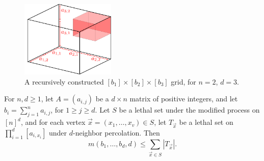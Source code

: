 \begin{figure}[]
\centering
\includegraphics[width=0.4\textwidth]{figures/2/recursion.pdf}
\caption{A recursively constructed $[b_1] \times [b_2] \times [b_3]$ grid, for $n = 2$, $d = 3$.}
\label{fig:recursion}
\end{figure} 

\begin{lem}
\label{lem:recursion}
For $n,d \geq 1$, let $A = (a_{i,j})$ be a $d \times n$ matrix of positive integers, and let $b_i = \sum_{j=1}^n a_{i,j}$, for $1 \geq j \geq d$. Let $S$ be a lethal set under the modified process on $[n]^d$, and for each vertex $\vec{x} = (x_1, \dots, x_v) \in S$, let $T_{\vec{x}}$ be a lethal set on $\prod_{i=1}^d [a_{i,x_i}]$ under $d$-neighbor percolation. Then
$$m(b_1, \dots, b_d, d) \leq \sum_{\vec{x} \in S} |T_{\vec{x}}|.$$
\end{lem}

